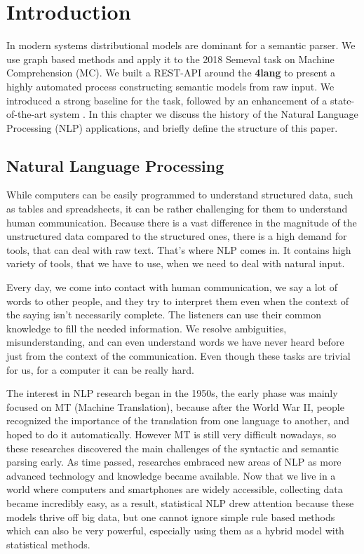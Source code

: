 \chapter{Introduction}
\label{chap:Introdu}
In modern systems distributional models are dominant for a semantic parser. We use graph based methods and apply it to the 2018 Semeval task on Machine Comprehension (MC). We built a REST-API around the \textbf{4lang}\cite{Recski:2016} to present a highly automated process constructing semantic models from raw input. We introduced a strong baseline for the task, followed by an enhancement of a state-of-the-art system \cite{Wang:2018}. In this chapter we discuss the history of the Natural Language Processing (NLP) applications, and briefly define the structure of this paper.
\section{Natural Language Processing}
While computers can be easily programmed to understand structured data, such as tables and spreadsheets, it can be rather challenging for them
to understand human communication. Because there is a vast difference in the magnitude of the unstructured data compared to the structured ones, there is a high demand
for tools, that can deal with raw text. That's where NLP comes in. It contains high variety of tools, that we have to use, when we need to deal with natural input.

Every day, we come into contact with human communication, we say a lot of words to other people, and they try to interpret them even when the context of the saying 
isn't necessarily complete. The listeners can use their common knowledge to fill the needed information. We resolve ambiguities, misunderstanding, and can even understand words 
we have never heard before just from the context of the communication.
Even though these tasks are trivial for us, for a computer it can be really hard.

The interest in NLP research began in the 1950s, the early phase was mainly focused on MT (Machine Translation), because after the World War II, people
recognized the importance of the translation from one language to another, and hoped to do it automatically.
However MT is still very difficult nowadays, so these researches discovered the main challenges of the syntactic and semantic parsing early.
As time passed, researches embraced new areas of NLP as more advanced technology and knowledge became available. Now that we live in a world where
computers and smartphones are widely accessible, collecting data became incredibly easy, as a result, statistical NLP drew attention because these models thrive off big data, but one cannot ignore 
simple rule based methods which can also be very powerful, especially using them as a hybrid model with statistical methods.

